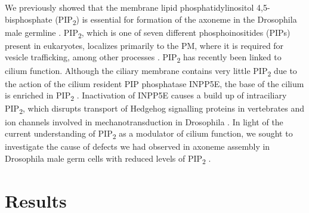 \documentclass[12pt, twoside, letterpaper]{article}
\newcommand{\PIP}{PIP\textsubscript{2}}
\begin{document}
\begin{doublespacing}
\begin{linenumbers}
    We previously showed that the membrane lipid phosphatidylinositol 4,5-bisphosphate
    (\PIP{}) is essential for formation of the axoneme in the Drosophila
    male germline \citep{wei2008depletion, fabian2010phosphatidylinositol}.
    \PIP{}, which is one of seven different phosphoinositides (PIPs) present in eukaryotes,
    localizes primarily to the PM, where it is required for
    vesicle trafficking, among
    other processes \citep{balla2013phosphoinositides}.
    \PIP{} has recently been linked to cilium function.
    Although the ciliary membrane contains very little \PIP{} due to the action
    of the cilium resident PIP phosphatase INPP5E,
    the base of the cilium is enriched in \PIP{}
    \citep{nakatsu2015phosphoinositide}.
    Inactivation of INPP5E causes a build up of intraciliary \PIP{},
    which disrupts transport of Hedgehog signalling proteins in vertebrates
    \citep{chavez2015modulation, garcia2015phosphoinositides, conduit2017compartmentalized}
    and ion channels involved in mechanotransduction in Drosophila \citep{park2015ciliary}.
    In light of the current understanding of \PIP{} as a modulator of cilium function,
    we sought to investigate the cause of defects we had observed
    in axoneme assembly in Drosophila male germ cells
    with reduced levels of \PIP{} \citep{wei2008depletion, fabian2010phosphatidylinositol}.

    \section*{Results}

\end{linenumbers}
\end{doublespacing}
\end{document}
